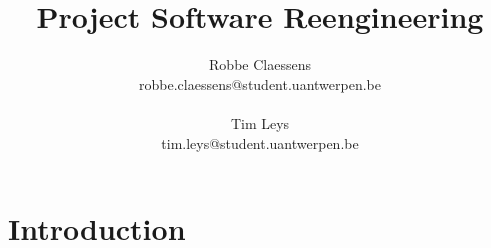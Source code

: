 \documentclass[]{article}
\title{Project Software Reengineering}
\author{Robbe Claessens \\ robbe.claessens@student.uantwerpen.be \\ \\Tim Leys\\tim.leys@student.uantwerpen.be}
\begin{document}
\maketitle



\section{Introduction}
\end{document}
